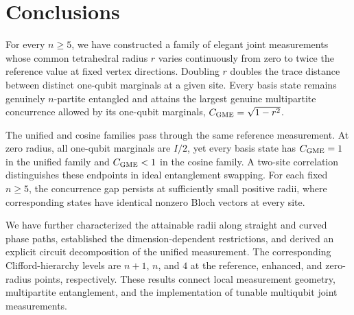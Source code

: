 \section{Conclusions}
\label{conclusions:section}

For every $n\ge5$, we have constructed a family of elegant joint measurements whose common tetrahedral radius $r$ varies continuously from zero to twice the reference value at fixed vertex directions. Doubling $r$ doubles the trace distance between distinct one-qubit marginals at a given site. Every basis state remains genuinely $n$-partite entangled and attains the largest genuine multipartite concurrence allowed by its one-qubit marginals, $C_{\rm GME}=\sqrt{1-r^2}$.

The unified and cosine families pass through the same reference measurement. At zero radius, all one-qubit marginals are $I/2$, yet every basis state has $C_{\rm GME}=1$ in the unified family and $C_{\rm GME}<1$ in the cosine family. A two-site correlation distinguishes these endpoints in ideal entanglement swapping. For each fixed $n\ge5$, the concurrence gap persists at sufficiently small positive radii, where corresponding states have identical nonzero Bloch vectors at every site.

We have further characterized the attainable radii along straight and curved phase paths, established the dimension-dependent restrictions, and derived an explicit circuit decomposition of the unified measurement. The corresponding Clifford-hierarchy levels are $n+1$, $n$, and $4$ at the reference, enhanced, and zero-radius points, respectively. These results connect local measurement geometry, multipartite entanglement, and the implementation of tunable multiqubit joint measurements.
